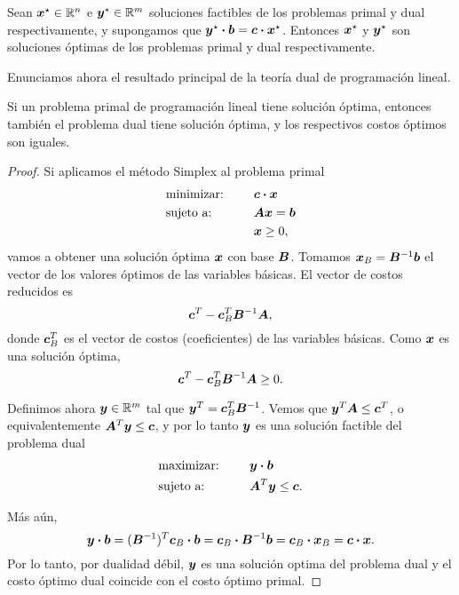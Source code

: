 \begin{coro}
Sean $\bm{x}^\star \in \mathbb{R}^n$ e $\bm{y}^\star \in \mathbb{R}^m$ soluciones factibles de los problemas primal y dual respectivamente, y supongamos que $\bm{y}^\star \boldsymbol{\cdot} \bm{b} = \bm{c} \boldsymbol{\cdot} \bm{x}^\star$. Entonces $\bm{x}^\star$ y $\bm{y}^\star$ son soluciones óptimas de los problemas primal y dual respectivamente.
\end{coro}

Enunciamos ahora el resultado principal de la teoría dual de programación lineal.

\begin{theorem}
Si un problema primal de programación lineal tiene solución óptima, entonces también el problema dual tiene solución óptima, y los respectivos costos óptimos son iguales.
\end{theorem}

\begin{proof}
  Si aplicamos el método Simplex al problema primal
\begin{alignat*}{2}
  & \text{minimizar: } & \quad & \bm{c} \boldsymbol{\cdot} \bm{x}  \\
  & \text{sujeto a: }   & & \bm{A} \bm{x} = \bm{b} \\
  & & & \bm{x} \ge 0,
\end{alignat*}
vamos a obtener una solución óptima $\bm{x}$ con base $\bm{B}$. Tomamos $\bm{x}_B = \bm{B}^{-1}\bm{b}$ el vector de los valores óptimos de las variables básicas.
El vector de costos reducidos es
$$\bm{c}^T - \bm{c}_B^T \bm{B}^{-1} \bm{A},$$
donde $\bm{c}_B^T$ es el vector de costos (coeficientes) de las variables básicas.
Como $\bm{x}$ es una solución óptima,
$$\bm{c}^T - \bm{c}_B^T \bm{B}^{-1} \bm{A} \ge 0.$$

Definimos ahora $\bm{y} \in \mathbb{R}^m$ tal que $\bm{y}^T = \bm{c}_B^T \bm{B}^{-1}$. Vemos que $\bm{y}^T \bm{A}  \le \bm{c}^T$, o equivalentemente $\bm{A}^T \bm{y} \le \bm{c}$, y por lo tanto $\bm{y}$ es una solución factible del problema dual
\begin{alignat*}{2}
  & \text{maximizar: } & \quad  & \bm{y} \boldsymbol{\cdot} \bm{b} \\
  & \text{sujeto a: }  & & \bm{A}^T \bm{y} \le \bm{c}.
\end{alignat*}

Más aún,
$$
\bm{y} \boldsymbol{\cdot} \bm{b} = (\bm{B}^{-1})^T \bm{c}_B \boldsymbol{\cdot} \bm{b} = \bm{c}_B \boldsymbol{\cdot} \bm{B}^{-1} \bm{b} = \bm{c}_B \boldsymbol{\cdot} \bm{x}_B = \bm{c} \boldsymbol{\cdot} \bm{x}.
$$
Por lo tanto, por dualidad débil, $\bm{y}$ es una solución optima del problema dual y el costo óptimo dual coincide con el costo óptimo primal.
\end{proof}



